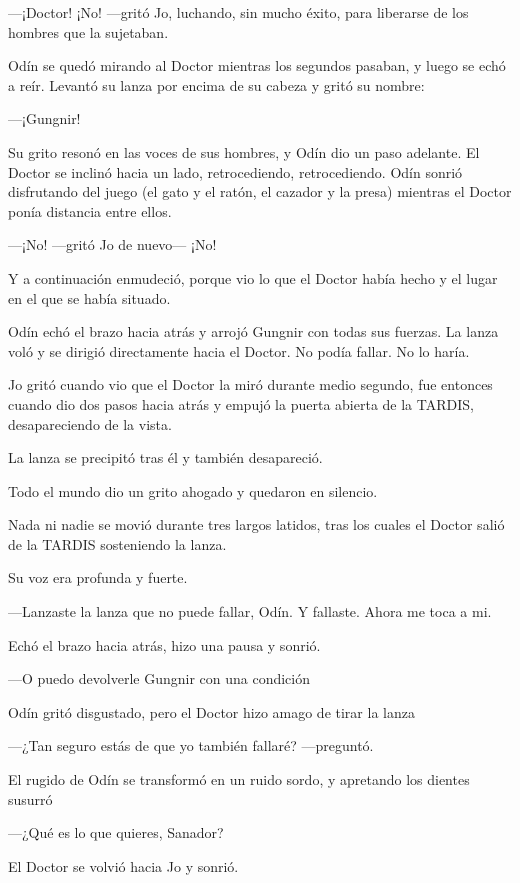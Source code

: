 ---¡Doctor! ¡No! ---gritó Jo, luchando, sin mucho éxito, para liberarse
de los hombres que la sujetaban.

Odín se quedó mirando al Doctor mientras los segundos pasaban, y luego
se echó a reír. Levantó su lanza por encima de su cabeza y gritó su
nombre:

---¡Gungnir!

Su grito resonó en las voces de sus hombres, y Odín dio un paso
adelante. El Doctor se inclinó hacia un lado, retrocediendo,
retrocediendo. Odín sonrió disfrutando del juego (el gato y el ratón, el
cazador y la presa) mientras el Doctor ponía distancia entre ellos.

---¡No! ---gritó Jo de nuevo--- ¡No!

Y a continuación enmudeció, porque vio lo que el Doctor había hecho y el
lugar en el que se había situado.

Odín echó el brazo hacia atrás y arrojó Gungnir con todas sus fuerzas.
La lanza voló y se dirigió directamente hacia el Doctor. No podía
fallar. No lo haría.

Jo gritó cuando vio que el Doctor la miró durante medio segundo, fue
entonces cuando dio dos pasos hacia atrás y empujó la puerta abierta de
la TARDIS, desapareciendo de la vista.

La lanza se precipitó tras él y también desapareció.

Todo el mundo dio un grito ahogado y quedaron en silencio.

Nada ni nadie se movió durante tres largos latidos, tras los cuales el
Doctor salió de la TARDIS sosteniendo la lanza.

Su voz era profunda y fuerte.

---Lanzaste la lanza que no puede fallar, Odín. Y fallaste. Ahora me
toca a mi.

Echó el brazo hacia atrás, hizo una pausa y sonrió.

---O puedo devolverle Gungnir con una condición

Odín gritó disgustado, pero el Doctor hizo amago de tirar la lanza

---¿Tan seguro estás de que yo también fallaré? ---preguntó.

El rugido de Odín se transformó en un ruido sordo, y apretando los
dientes susurró

---¿Qué es lo que quieres, Sanador?

El Doctor se volvió hacia Jo y sonrió.
